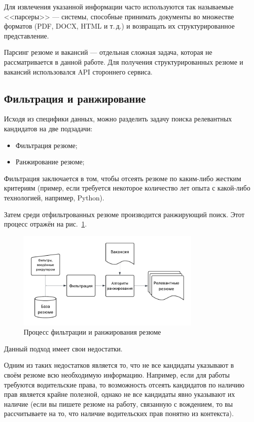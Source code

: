 \documentclass[14pt]{mmcs_article}
\begin{document}
Для извлечения указанной информации часто используются так называемые <<парсеры>> --- системы, способные принимать документы во множестве форматов (PDF, DOCX, HTML и т.\,д.) и возвращать их структурированное представление.

Парсинг резюме и вакансий --- отдельная сложная задача, которая не рассматривается в данной работе. Для получения структурированных резюме и вакансий использовался API стороннего сервиса.

\subsection{Фильтрация и ранжирование}\label{filtering_and_ranking}

Исходя из специфики данных, можно разделить задачу поиска релевантных кандидатов на две подзадачи:

\begin{itemize}
  \item Фильтрация резюме;
  \item Ранжирование резюме;
\end{itemize}

Фильтрация заключается в том, чтобы отсеять резюме по каким-либо жестким критериям (пример, если требуется некоторое количество лет опыта с какой-либо технологией, например, Python).

Затем среди отфильтрованных резюме производится ранжирующий поиск. Этот процесс отражён на рис.~\ref{fig:filtering_and_ranking}.

\begin{figure}[h]
  \centering
  \includegraphics[width=0.8\textwidth]{plots/filtering_and_ranking.pdf}
  \caption{Процесс фильтрации и ранжирования резюме}
  \label{fig:filtering_and_ranking}
\end{figure}

Данный подход имеет свои недостатки.

Одним из таких недостатков является то, что не все кандидаты указывают в своём резюме всю необходимую информацию. Например, если для работы требуются водительские права, то возможность отсеять кандидатов по наличию прав является крайне полезной, однако не все кандидаты явно указывают их наличие (если вы пишете резюме на работу, связанную с вождением, то вы рассчитываете на то, что наличие водительских прав понятно из контекста).
\end{document}

